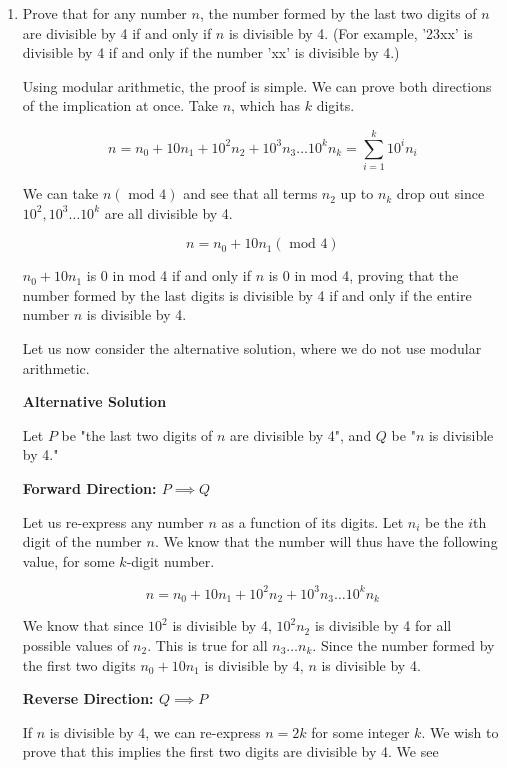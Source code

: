
\begin{enumerate}
\item Prove that for any number $n$, the number formed by the last two digits of $n$ are divisible by 4 if and only if $n$ is divisible by 4. (For example, '23xx' is divisible by 4 if and only if the number 'xx' is divisible by 4.)

\begin{solution}

Using modular arithmetic, the proof is simple. We can prove both directions
of the implication at once. Take $n$, which has $k$ digits.

$$n = n_0 + 10 n_1 + 10^2 n_2 + 10^3 n_3 \dots 10^k n_k = \sum_{i=1}^k 10^i n_i$$

We can take $n (\text{ mod } 4)$ and see that all terms $n_2$ up to $n_k$ drop
out since $10^2, 10^3 \dots 10^k$ are all divisible by 4.

$$n = n_0 + 10 n_1 (\text{ mod } 4)$$

$n_0 + 10n_1$ is 0 in mod 4 if and only if $n$ is 0 in mod 4, proving that
the number formed by the last digits is divisible by 4 if and only if
the entire number $n$ is divisible by 4.

Let us now consider the alternative solution, where we do not use modular
arithmetic.

\textbf{Alternative Solution}

Let $P$ be "the last two digits of $n$ are divisible by 4", and $Q$ be
"$n$ is divisible by 4."

\textbf{Forward Direction: $P \implies Q$}

Let us re-express any number $n$ as a function of its digits. Let $n_i$
be the $i$th digit of the number $n$. We know that the number will thus have
the following value, for some $k$-digit number.

$$n = n_0 + 10 n_1 + 10^2 n_2 + 10^3 n_3 \dots 10^k n_k$$

We know that since $10^2$ is divisible by 4, $10^2 n_2$ is divisible by 4 for all
possible values of $n_2$. This is true for all $n_3 \dots n_k$. Since the number
formed by the first two digits $n_0 + 10n_1$ is divisible by 4, $n$ is
divisible by 4.

\textbf{Reverse Direction: $Q \implies P$}

If $n$ is divisible by 4, we can re-express $n = 2k$ for some integer $k$. We
wish to prove that this implies the first two digits are divisible by 4. We see


\end{solution}
\end{enumerate}
